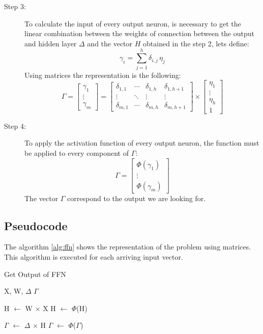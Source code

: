 \begin{description}
  \item[Step 3:]
    To calculate the input of every output neuron,
    is necessary to get the linear combination
    between the weights of connection between the output
    and hidden layer $\Delta$ and the vector $H$ obtained in the step 2, lets define:
    \[
      \gamma_{i} =
      \sum_{j=1}^{h}
      \delta_{i,j}\,\eta_j
    \]
    Using matrices the representation is the following:
    \[
      \Gamma =
      \begin{bmatrix}
        \gamma_1 \\
        \vdots   \\
        \gamma_m
      \end{bmatrix}
      =
      \left[
        \begin{array}{ccc|c}
          \delta_{1,1} & \cdots & \delta_{1,h} & \delta_{1,h+1} \\
          \vdots       & \ddots & \vdots       & \vdots         \\
          \delta_{m,1} & \cdots & \delta_{m,h} &\delta_{m,h+1}
        \end{array}
      \right]
      \times
      \begin{bmatrix}
        \eta_1 \\
        \vdots \\
        \eta_h \\
        1
      \end{bmatrix}
    \]

  \item[Step 4:]
    To apply the activation function of every output neuron,
    the function must be applied to every component of $\Gamma$:
    \[
      \Gamma=
      \begin{bmatrix}
        \Phi(\gamma_1) \\
        \vdots         \\
        \Phi(\gamma_m)
      \end{bmatrix}
    \]
    The vector $\Gamma$ correspond to the output we are looking for.

\end{description}


\subsection*{Pseudocode}
The algorithm \ref{alg:ffn} shows the representation of the problem using matrices.
This algorithm is executed for each arriving input vector.

\begin{algorithm}
  \caption{Get Output of FFN}
  \begin{algorithmic}
    \label{alg:ffn}
    \REQUIRE X, W, $\Delta$
    \ENSURE $\Gamma$

    \STATE H $\leftarrow$ W $\times$ X
    \STATE H $\leftarrow$ $\Phi$(H)

    \STATE $\Gamma$ $\leftarrow$ $\Delta$ $\times$ H
    \STATE $\Gamma$ $\leftarrow$ $\Phi$($\Gamma$)
  \end{algorithmic}
\end{algorithm}



